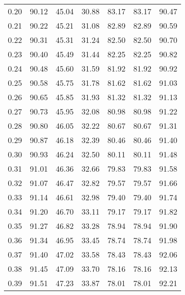 \begin{tabular}{|c|c|c|c|c|c|c|}
      0.20 &     90.12 &     45.04 &      30.88 &   83.17 &      83.17 &         90.47 \\
      0.21 &     90.22 &     45.21 &      31.08 &   82.89 &      82.89 &         90.59 \\
      0.22 &     90.31 &     45.31 &      31.24 &   82.50 &      82.50 &         90.70 \\
      0.23 &     90.40 &     45.49 &      31.44 &   82.25 &      82.25 &         90.82 \\
      0.24 &     90.48 &     45.60 &      31.59 &   81.92 &      81.92 &         90.92 \\
      0.25 &     90.58 &     45.75 &      31.78 &   81.62 &      81.62 &         91.03 \\
      0.26 &     90.65 &     45.85 &      31.93 &   81.32 &      81.32 &         91.13 \\
      0.27 &     90.73 &     45.95 &      32.08 &   80.98 &      80.98 &         91.22 \\
      0.28 &     90.80 &     46.05 &      32.22 &   80.67 &      80.67 &         91.31 \\
      0.29 &     90.87 &     46.18 &      32.39 &   80.46 &      80.46 &         91.40 \\
      0.30 &     90.93 &     46.24 &      32.50 &   80.11 &      80.11 &         91.48 \\
      0.31 &     91.01 &     46.36 &      32.66 &   79.83 &      79.83 &         91.58 \\
      0.32 &     91.07 &     46.47 &      32.82 &   79.57 &      79.57 &         91.66 \\
      0.33 &     91.14 &     46.61 &      32.98 &   79.40 &      79.40 &         91.74 \\
      0.34 &     91.20 &     46.70 &      33.11 &   79.17 &      79.17 &         91.82 \\
      0.35 &     91.27 &     46.82 &      33.28 &   78.94 &      78.94 &         91.90 \\
      0.36 &     91.34 &     46.95 &      33.45 &   78.74 &      78.74 &         91.98 \\
      0.37 &     91.40 &     47.02 &      33.58 &   78.43 &      78.43 &         92.06 \\
      0.38 &     91.45 &     47.09 &      33.70 &   78.16 &      78.16 &         92.13 \\
      0.39 &     91.51 &     47.23 &      33.87 &   78.01 &      78.01 &         92.21 \\

\end{tabular}
